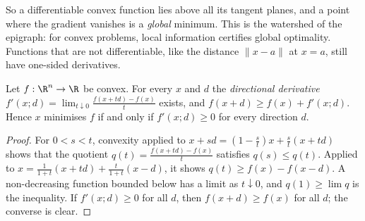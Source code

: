 So a differentiable convex function lies above all its tangent planes, and a point where the gradient vanishes is a \emph{global} minimum. This is the
watershed of the epigraph: for convex problems, local information certifies global optimality. Functions that are not differentiable, like the distance
$\|x-a\|$ at $x=a$, still have one-sided derivatives.

\begin{lemma}\label{lem:dirderiv}
Let $f:\R^n\to\R$ be convex. For every $x$ and $d$ the \emph{directional derivative} $f'(x;d)=\lim_{t\downarrow0}\frac{f(x+td)-f(x)}t$ exists, and
$f(x+d)\ge f(x)+f'(x;d)$. Hence $x$ minimises $f$ if and only if $f'(x;d)\ge0$ for every direction $d$.
\end{lemma}
\begin{proof}
For $0<s<t$, convexity applied to $x+sd=(1-\frac st)x+\frac st(x+td)$ shows that the quotient $q(t)=\frac{f(x+td)-f(x)}t$ satisfies $q(s)\le q(t)$. Applied to
$x=\frac1{1+t}(x+td)+\frac t{1+t}(x-d)$, it shows $q(t)\ge f(x)-f(x-d)$. A non-decreasing function bounded below has a limit as $t\downarrow0$, and $q(1)\ge\lim q$ is the
inequality. If $f'(x;d)\ge0$ for all $d$, then $f(x+d)\ge f(x)$ for all $d$; the converse is clear.
\end{proof}

